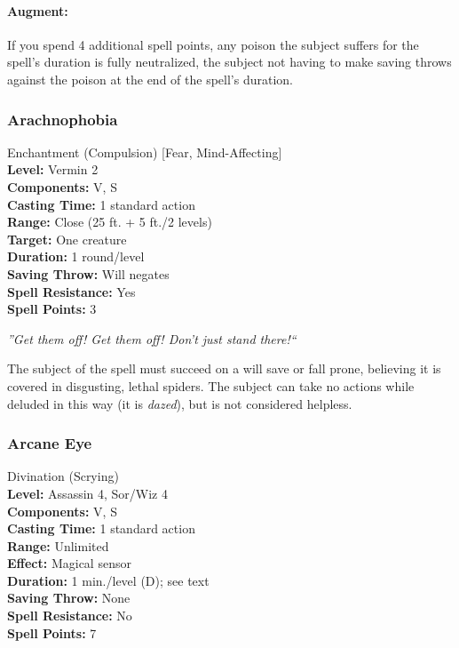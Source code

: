 \paragraph{Augment:} If you spend 4 additional spell points, any poison the subject suffers for the spell's duration is fully neutralized, the subject not having to make saving throws against the poison at the end of the spell's duration.
\subsubsection{Arachnophobia}
\label{Spell:Arachnophobia}
Enchantment (Compulsion) [Fear, Mind-Affecting]
\\ \textbf{Level:} Vermin 2
\\ \textbf{Components:} V, S
\\ \textbf{Casting Time:} 1 standard action
\\ \textbf{Range:} Close (25 ft. + 5 ft./2 levels)
\\ \textbf{Target:} One creature
\\ \textbf{Duration:} 1 round/level
\\ \textbf{Saving Throw:} Will negates
\\ \textbf{Spell Resistance:} Yes
\\ \textbf{Spell Points:} 3

\emph{''Get them off! Get them off! Don't just stand there!``} 

The subject of the spell must succeed on a will save or fall prone, believing it is covered in disgusting, lethal spiders. 
The subject can take no actions while deluded in this way (it is \emph{dazed}), but is not considered helpless.

\subsubsection{Arcane Eye}
\label{Spell:ArcaneEye}
Divination (Scrying)
\\ \textbf{Level:} Assassin 4, Sor/Wiz 4
\\ \textbf{Components:} V, S
\\ \textbf{Casting Time:} 1 standard action
\\ \textbf{Range:} Unlimited
\\ \textbf{Effect:} Magical sensor
\\ \textbf{Duration:} 1 min./level (D); see text
\\ \textbf{Saving Throw:} None
\\ \textbf{Spell Resistance:} No
\\ \textbf{Spell Points:} 7

